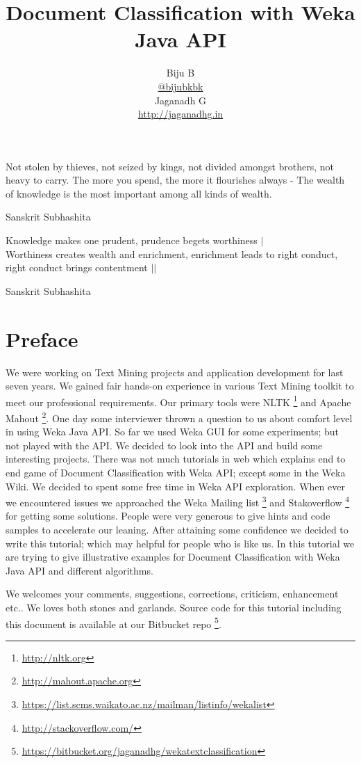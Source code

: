 \documentclass[a4paper,serif,12pt]{report}
\title{Document Classification with Weka Java API}
\author{Biju B\\ \url{@bijubkbk} \\ Jaganadh G \\ \url{http://jaganadhg.in}}
\begin{document}
\maketitle
\section*{}
\epigraph{Not stolen by thieves, not seized by kings, not divided amongst brothers, not heavy to carry. The more you spend, the more it flourishes always - The wealth of knowledge is the most important among all kinds of wealth.}{Sanskrit Subhashita} 
\epigraph{Knowledge makes one prudent, prudence begets worthiness $|$ \\
Worthiness creates wealth and enrichment, enrichment leads to right conduct, right conduct brings contentment $||$}{Sanskrit Subhashita}


\pagebreak
\section*{Preface}
We were working on Text Mining projects and application development for last seven years. We gained fair hands-on experience in various Text Mining toolkit to meet our professional requirements. Our primary tools were NLTK \footnote{\url{http://nltk.org}} and Apache Mahout \footnote{\url{http://mahout.apache.org}}. One day some interviewer thrown a question to us about comfort level in using Weka Java API. So far we used Weka GUI for some experiments; but not played with the API. We decided to look into the API and build some interesting projects. There was not much tutorials in web which explains end to end game of Document Classification with Weka API; except some in the Weka Wiki. We decided to spent some free time in Weka API exploration. When ever we encountered issues we approached the Weka Mailing list \footnote{\url{https://list.scms.waikato.ac.nz/mailman/listinfo/wekalist}} and Stakoverflow \footnote{\url{http://stackoverflow.com/}} for getting some solutions. People were very generous to give hints 
and code samples to accelerate our leaning. After attaining some confidence we decided to write this tutorial; which may helpful for people who is like us. In this tutorial we are trying to give illustrative examples for Document Classification with Weka Java API and different algorithms. 

We welcomes your comments, suggestions, corrections, criticism, enhancement etc.. We loves both stones and garlands. Source code for this tutorial including this document is available at our Bitbucket repo \footnote{\url{https://bitbucket.org/jaganadhg/wekatextclassification}}. 
\pagebreak 
\end{document}
